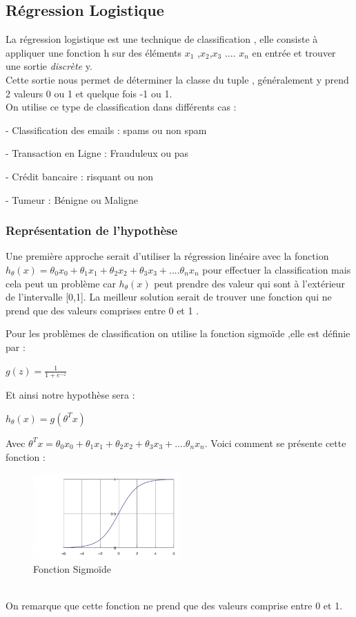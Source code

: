  \subsection{Régression Logistique  }
 La régression logistique est une technique de classification , elle consiste à appliquer une fonction h sur des éléments ${x}_{1}$ ,${x}_{2}$,${x}_{3}$ .... ${x}_{n}$ en entrée et trouver une sortie \emph{discrète} y. \\
 Cette sortie nous permet de déterminer la classe du tuple , généralement y prend 2 valeurs 0 ou 1 et quelque fois -1  ou 1.\\
 On utilise ce type de classification dans différents cas :

 - Classification des emails : spams ou non spam

 - Transaction en Ligne : Frauduleux ou pas

 - Crédit bancaire : risquant ou non

 - Tumeur : Bénigne ou Maligne

\subsubsection{Représentation de l'hypothèse}
Une première approche serait d'utiliser la régression linéaire avec la fonction ${h}_{\theta}\left(x\right)={\theta }_{0}{x}_{0}+{\theta }_{1}{x}_{1}+{\theta }_{2}{x}_{2}+{\theta }_{3}{x}_{3}+....{\theta }_{n}{x}_{n}$  pour effectuer la classification mais cela peut un problème car ${h}_{\theta}\left(x\right)$ peut prendre des valeur qui sont à l'extérieur de  l'intervalle [0,1].
La meilleur solution serait de trouver une fonction qui ne prend que des valeurs comprises entre 0 et 1 .

Pour les problèmes de classification on utilise la fonction sigmoïde ,elle est définie par :

\begin{center}
	$g(z) =\frac{1}{1+{e}^{-z}}$
\end{center}
Et ainsi notre hypothèse sera :
\begin{center}
	${h}_{\theta}\left(x\right)=g({\theta }^{T}{x})$
\end{center}
Avec ${\theta }^{T}{x}={\theta }_{0}{x}_{0}+{\theta }_{1}{x}_{1}+{\theta }_{2}{x}_{2}+{\theta }_{3}{x}_{3}+....{\theta }_{n}{x}_{n}$.
Voici comment se présente cette fonction :
\begin{figure}[ht]
	\centering
	\includegraphics[width=0.5\textwidth]{fig/FonctionSigm.png}
	\caption[Short caption]{Fonction Sigmoïde}
	\label{fig:image4}
\end{figure} \\
On remarque que cette fonction ne prend que des valeurs comprise entre 0 et 1.

